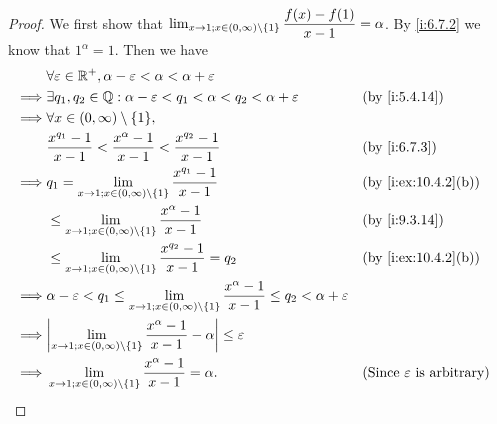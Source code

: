 \begin{proof}
  We first show that \(\lim_{x \to 1 ; x \in (0, \infty) \setminus \left\lbrace1\right\rbrace} \dfrac{f(x) - f(1)}{x - 1} = \alpha\).
  By \cref{i:6.7.2} we know that \(1^{\alpha} = 1\).
  Then we have
  \begin{align*}
             & \forall \varepsilon \in \R^+, \alpha - \varepsilon < \alpha < \alpha + \varepsilon                                                                                                                  \\
    \implies & \exists q_1, q_2 \in \Q : \alpha - \varepsilon < q_1 < \alpha < q_2 < \alpha + \varepsilon                                                         &  & \by{i:5.4.14}                               \\
    \implies & \forall x \in (0, \infty) \setminus \set{1},                                                                                                                                                        \\
             & \dfrac{x^{q_1} - 1}{x - 1} < \dfrac{x^{\alpha} - 1}{x - 1} < \dfrac{x^{q_2} - 1}{x - 1}                                                            &  & \by{i:6.7.3}                                \\
    \implies & q_1 = \lim_{x \to 1 ; x \in (0, \infty) \setminus \set{1}} \dfrac{x^{q_1} - 1}{x - 1}                                                              &  & \by{i:ex:10.4.2}[b]                         \\
             & \leq \lim_{x \to 1 ; x \in (0, \infty) \setminus \set{1}} \dfrac{x^{\alpha} - 1}{x - 1}                                                            &  & \by{i:9.3.14}                               \\
             & \leq \lim_{x \to 1 ; x \in (0, \infty) \setminus \set{1}} \dfrac{x^{q_2} - 1}{x - 1} = q_2                                                         &  & \by{i:ex:10.4.2}[b]                         \\
    \implies & \alpha - \varepsilon < q_1 \leq \lim_{x \to 1 ; x \in (0, \infty) \setminus \set{1}} \dfrac{x^{\alpha} - 1}{x - 1} \leq q_2 < \alpha + \varepsilon                                                  \\
    \implies & \abs{\lim_{x \to 1 ; x \in (0, \infty) \setminus \set{1}} \dfrac{x^{\alpha} - 1}{x - 1} - \alpha} \leq \varepsilon                                                                                  \\
    \implies & \lim_{x \to 1 ; x \in (0, \infty) \setminus \set{1}} \dfrac{x^{\alpha} - 1}{x - 1} = \alpha.                                                       &  & \text{(Since \(\varepsilon\) is arbitrary)}
  \end{align*}


\end{proof}
